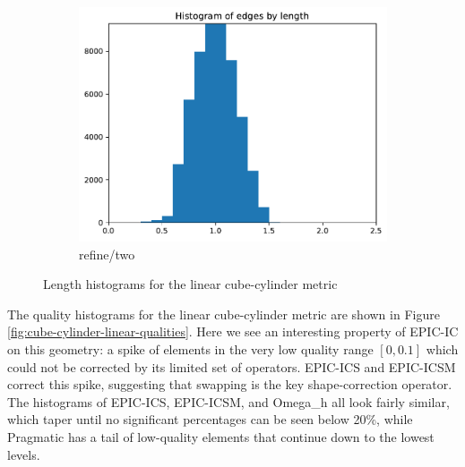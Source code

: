 \documentclass[3p,times,procedia,number]{elsarticle}
\begin{document}
\begin{figure}
\begin{subfigure}{.16\textwidth}
\includegraphics[width=\textwidth]{refine-two-cube-cylinder-linear-length.pdf}
\caption{refine/two}
\end{subfigure}
\caption{Length histograms for the linear cube-cylinder metric}
\label{fig:cube-cylinder-linear-lengths}
\end{figure}
The quality histograms for the linear cube-cylinder metric
are shown in Figure \ref{fig:cube-cylinder-linear-qualities}.
Here we see an interesting property of EPIC-IC on this geometry:
a spike of elements in the very low quality range $[0,0.1]$
which could not be corrected by its limited set of operators.
EPIC-ICS and EPIC-ICSM correct this spike, suggesting that
swapping is the key shape-correction operator.
The histograms of EPIC-ICS, EPIC-ICSM, and Omega\_h all look fairly
similar, which taper until no significant percentages can be
seen below 20\%, while Pragmatic has a tail of low-quality
elements that continue down to the lowest levels.
\end{document}
